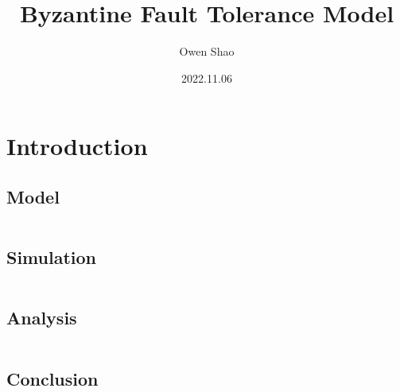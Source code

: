 \documentclass[12pt,a4paper]{article}
\begin{document}
\title{Byzantine Fault Tolerance Model}

\author{Owen Shao}

\date{2022.11.06}

\maketitle

\section{Introduction}

\subsection{Model}

\begin{equation}
\label{eq:model}
\end{equation}

\subsection{Simulation}

\begin{equation}
\label{eq:simulation}
\end{equation}

\subsection{Analysis}
\begin{equation}
\label{eq:analysis}
\end{equation}

\subsection{Conclusion}

\begin{equation}
\label{eq:conclusion}
\end{equation}

\end{document}
